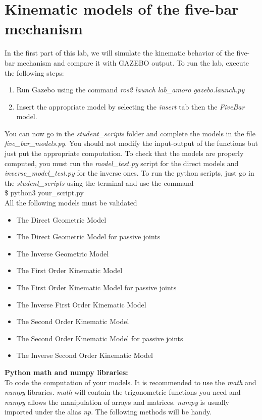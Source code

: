 \documentclass[a4paper]{article}
\begin{document}
\section{Kinematic models of the five-bar mechanism}
\label{analysis}
In the first part of this lab, we will simulate the kinematic behavior of the five-bar mechanism and compare it with GAZEBO output. To run the lab, execute the following steps:
\begin{enumerate}
    \item Run Gazebo using the command \textit{ros2 launch lab\_amoro gazebo.launch.py}
    \item Insert the appropriate model by selecting the \textit{insert} tab then the \textit{FiveBar} model.
\end{enumerate}
You can now go in the \textit{student\_scripts} folder and complete the models in the file \textit{five\_bar\_models.py}. You should not modify the input-output of the functions but just put the appropriate computation. To check that the models are properly computed, you must run the \textit{model\_test.py} script for the direct models and \textit{inverse\_model\_test.py} for the inverse ones. To run the python scripts, just go in the \textit{student\_scripts} using the terminal and use the command\\
\$ python3 your\_script.py
\\
%
All the following models must be validated
\begin{itemize}
    \item The Direct Geometric Model
    \item The Direct Geometric Model for passive joints
    \item The Inverse Geometric Model
    \item The First Order Kinematic Model
    \item The First Order Kinematic Model for passive joints
    \item The Inverse First Order Kinematic Model
    \item The Second Order Kinematic Model
    \item The Second Order Kinematic Model for passive joints
    \item The Inverse Second Order Kinematic Model
\end{itemize}
%
\textbf{Python math and numpy libraries:}\\
To code the computation of your models. It is recommended to use the \textit{math} and \textit{numpy} libraries. \textit{math} will contain the trigonometric functions you need and \textit{numpy} allows the manipulation of arrays and matrices. \textit{numpy} is usually imported under the alias \textit{np}. The following methods will be handy.
\end{document}
